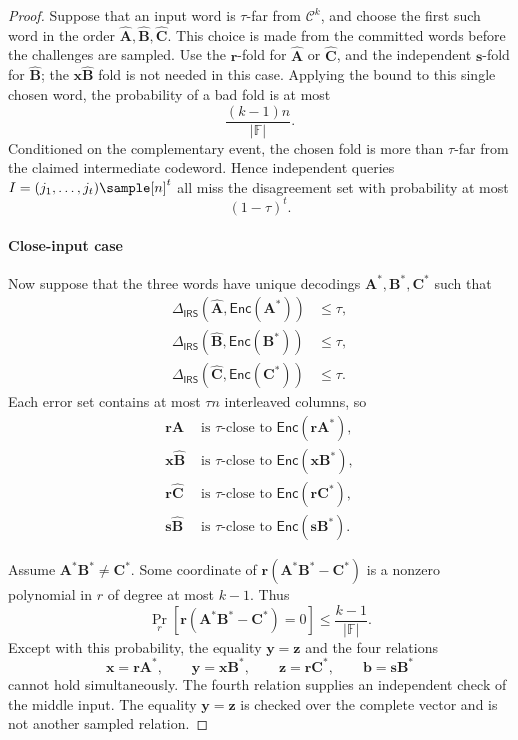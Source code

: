 \documentclass[conference,compsoc]{IEEEtran}
\newif\ifshowrevisions
\newenvironment{revblock}[1][]
  {%
    \ifshowrevisions
      \begin{tcolorbox}[
        breakable,
        colback=revisionyellow,
        colframe=revisionyellow,
        boxrule=0pt,
        arc=0pt,
        left=2pt,
        right=2pt,
        top=2pt,
        bottom=2pt,
        before skip=2pt,
        after skip=2pt,
        #1
      ]
    \fi
  }
  {%
    \ifshowrevisions
      \end{tcolorbox}
    \fi
  }
\newcommand{\mat}{\mathbf}          %
\newcommand{\vect}{\mathbf}         %
\renewcommand{\enc}{\mathsf{Enc}}   %
\theoremstyle{plain}
\theoremstyle{definition}
\theoremstyle{remark}
\begin{document}
\begin{revblock}
\begin{proof}
Suppose that an input word is \(\tau\)-far from \(\mathcal C^k\), and choose
the first such word in the order
\(\widehat{\mat A},\widehat{\mat B},\widehat{\mat C}\).  This choice is made
from the committed words before the challenges are sampled.  Use the
\(\vect r\)-fold for \(\widehat{\mat A}\) or \(\widehat{\mat C}\), and the
independent \(\vect s\)-fold for \(\widehat{\mat B}\); the
\(\vect x\widehat{\mat B}\) fold is not needed in this case.  Applying the
bound to this single chosen word, the probability of a bad fold is at most
\[
 \frac{(k-1)n}{|\mathbb F|}.
\]
Conditioned on the complementary event, the chosen fold is more than
\(\tau\)-far from the claimed intermediate codeword.  Hence independent
queries \(I=(j_1,\ldots,j_t)\sample[n]^t\) all miss the disagreement set with
probability at most
\[
 (1-\tau)^t.
\]

\paragraph{Close-input case}
Now suppose that the three words have unique decodings
\(\mat A^*,\mat B^*,\mat C^*\) such that
\[
\begin{aligned}
 \Delta_{\mathsf{IRS}}(\widehat{\mat A},\enc(\mat A^*))&\le\tau,\\
 \Delta_{\mathsf{IRS}}(\widehat{\mat B},\enc(\mat B^*))&\le\tau,\\
 \Delta_{\mathsf{IRS}}(\widehat{\mat C},\enc(\mat C^*))&\le\tau.
\end{aligned}
\]
Each error set contains at most \(\tau n\) interleaved columns, so
\[
\begin{aligned}
 \vect r\widehat{\mat A}&\text{ is $\tau$-close to }
   \enc(\vect r\mat A^*),\\
 \vect x\widehat{\mat B}&\text{ is $\tau$-close to }
   \enc(\vect x\mat B^*),\\
 \vect r\widehat{\mat C}&\text{ is $\tau$-close to }
   \enc(\vect r\mat C^*),\\
 \vect s\widehat{\mat B}&\text{ is $\tau$-close to }
   \enc(\vect s\mat B^*).
\end{aligned}
\]

Assume \(\mat A^*\mat B^*\ne\mat C^*\).  Some coordinate of
\(\vect r(\mat A^*\mat B^*-\mat C^*)\) is a nonzero polynomial in \(r\) of
degree at most \(k-1\).  Thus
\[
 \Pr_r[\vect r(\mat A^*\mat B^*-\mat C^*)=0]
 \le\frac{k-1}{|\mathbb F|}.
\]
Except with this probability, the equality \(\vect y=\vect z\) and the four
relations
\[
 \vect x=\vect r\mat A^*,\qquad
 \vect y=\vect x\mat B^*,\qquad
 \vect z=\vect r\mat C^*,\qquad
 \vect b=\vect s\mat B^*
\]
cannot hold simultaneously.  The fourth relation supplies an independent
check of the middle input.  The equality \(\vect y=\vect z\) is checked over
the complete vector and is not another sampled relation.


\end{proof}
\end{revblock}
\end{document}
